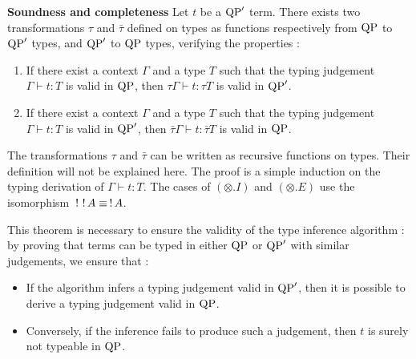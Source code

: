 \begin{thm}{\bf Soundness and completeness} Let $t$ be a ${\rm QP}'$ term. There exists two transformations $\tau$ and
	$\bar \tau$ defined on types as functions respectively from ${\rm QP}$ to ${\rm QP}'$ types, and ${\rm QP}'$ to ${\rm QP}$ types, verifying the properties :
	\begin{enumerate}
		\item If there exist a context $\Gamma$ and a type $T$ such that the typing judgement $\Gamma \vdash t : T$ is valid in ${\rm QP}$, then
			$\tau\Gamma \vdash t : \tau T$ is valid in ${\rm QP}'$.
		\item If there exist a context $\Gamma$ and a type $T$ such that the typing judgement $\Gamma \vdash t : T$ is valid in ${\rm QP}'$, then
			$\bar \tau \Gamma \vdash t : \bar \tau T$ is valid in ${\rm QP}$.
	\end{enumerate}
	
	\begin{proofsketch}
		The transformations $\tau$ and $\bar \tau$ can be written as recursive functions on types. Their definition will not be explained
		here. The proof is a simple induction on the typing derivation of $\Gamma \vdash t : T$. The cases of $(\otimes.I)$ and
		$(\otimes.E)$ use the isomorphism $\,!\,\,!\, A \equiv \,!\, A$.
	\end{proofsketch}
\end{thm}

\begin{remark}
	This theorem is necessary to ensure the validity of the type inference algorithm : by proving that
	terms can be typed in either ${\rm QP}$ or ${\rm QP}'$ with similar judgements, we ensure that :
	\begin{itemize}
		\item If the algorithm infers a typing judgement valid in ${\rm QP}'$, then it is possible to derive a typing judgement valid in ${\rm QP}$.
		\item Conversely, if the inference fails to produce such a judgement, then $t$ is surely not typeable in ${\rm QP}$.
	\end{itemize}
\end{remark}

